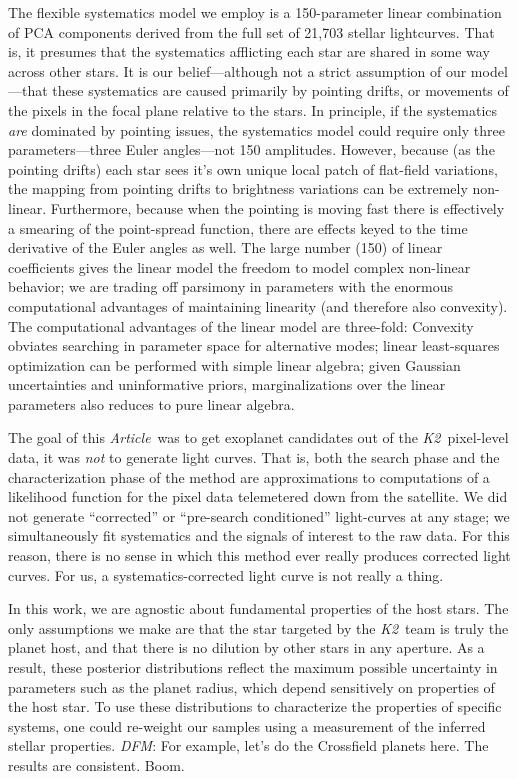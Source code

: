\documentclass[12pt,preprint]{aastex}
\newcommand{\project}[1]{\textsl{#1}} %
\newcommand{\KT}{\project{K2}}
\newcommand{\paper}{\textsl{Article}}
\newcommand{\todo}[3]{{\color{#2}\emph{#1}: #3}}
\newcommand{\dfmtodo}[1]{\todo{DFM}{red}{#1}}
\begin{document}
The flexible systematics model we employ is a 150-parameter linear combination
of PCA components derived from the full set of 21,703 stellar lightcurves.
That is, it presumes that the systematics afflicting each star are shared in
some way across other stars.
It is our belief---although not a strict assumption of our model---that these
systematics are caused primarily by pointing drifts, or movements of the
pixels in the focal plane relative to the stars.
In principle, if the systematics \emph{are} dominated by pointing issues, the
systematics model could require only three parameters---three Euler
angles---not 150 amplitudes.
However, because (as the pointing drifts) each star sees it's own unique
local patch of flat-field variations, the mapping from pointing drifts to
brightness variations can be extremely non-linear.
Furthermore, because when the pointing is moving fast there is effectively
a smearing of the point-spread function, there are effects keyed to the
time derivative of the Euler angles as well.
The large number (150) of linear coefficients gives the linear model the
freedom to model complex non-linear behavior; we are trading off parsimony
in parameters with the enormous computational advantages of maintaining
linearity (and therefore also convexity).
The computational advantages of the linear model are three-fold:
Convexity obviates searching in parameter space for alternative modes;
linear least-squares optimization can be performed with simple linear algebra;
given Gaussian uncertainties and uninformative priors, marginalizations over
the linear parameters also reduces to pure linear algebra.

The goal of this \paper\ was to get exoplanet candidates out of the
\KT\ pixel-level data, it was \emph{not} to generate light curves.
That is, both the search phase and the characterization phase of the method
are approximations to computations of a likelihood function for the pixel
data telemetered down from the satellite.
We did not generate ``corrected'' or ``pre-search conditioned'' light-curves
at any stage; we simultaneously fit systematics and the signals of interest
to the raw data.
For this reason, there is no sense in which this method ever really
produces corrected light curves.
For us, a systematics-corrected light curve is not really a thing.

In this work, we are agnostic about fundamental properties of the host stars.
The only assumptions we make are that the star targeted by the \KT\
team is truly the planet host, and that there is no dilution by other stars in
any aperture.
As a result, these posterior distributions reflect the maximum possible
uncertainty in parameters such as the planet radius, which depend sensitively
on properties of the host star.
To use these distributions to characterize the properties of specific systems,
one could re-weight our samples using a measurement of the inferred stellar
properties.
\dfmtodo{For example, let's do the Crossfield planets here. The results are
consistent. Boom.}
\end{document}

